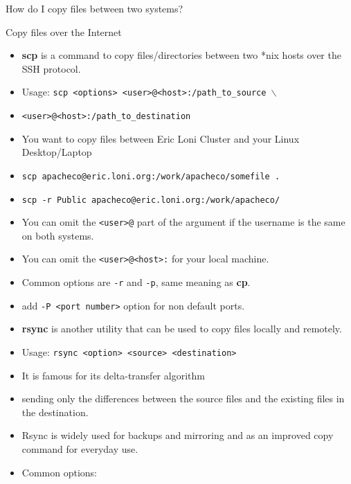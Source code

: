 \documentclass[slidestop,mathserif,compress,xcolor=svgnames]{beamer}
\newenvironment{bblock}[0]
{
\begin{beamerboxesrounded}[upper=uppercol1,lower=lowercol1,shadow=true]}
{\end{beamerboxesrounded}}
\begin{document}
\begin{frame}[allowframebreaks]{\small How do I copy files between two systems?} 
  \begin{bblock}{Copy files over the Internet}
    \begin{itemize}
      \item \textbf{scp} is a command to copy files/directories between two *nix hosts over the SSH protocol.
      \item Usage: \texttt{scp <options> <user>@<host>:/path\_to\_source $\backslash$}\\
      \item[] \quad\quad \texttt{<user>@<host>:/path\_to\_destination}
      \item[e.g.] You want to copy files between Eric Loni Cluster and your Linux Desktop/Laptop
      \item[] \texttt{scp apacheco@eric.loni.org:/work/apacheco/somefile .}
      \item[] \texttt{scp -r Public apacheco@eric.loni.org:/work/apacheco/}
      \item You can omit the \texttt{<user>@} part of the argument if the username is the same on both systems.
      \item You can omit the \texttt{<user>@<host>:} for your local machine.
      \item Common options are \texttt{-r} and \texttt{-p}, same meaning as \textbf{cp}.
      \item add \texttt{-P <port number>} option for non default ports.
    \end{itemize}
  \end{bblock}
  \framebreak
  \begin{bblock}{}
    \begin{itemize}
      \item \textbf{rsync} is another utility that can be used to copy files locally and remotely.
      \item Usage: \texttt{rsync <option> <source> <destination>}
      \item It is famous for its delta-transfer algorithm
      \item[i.e.] sending only the differences between  the  source  files and  the  existing  files in the destination.  
     \item Rsync is widely used for backups and mirroring and as an improved copy command for everyday use.
     \item Common options:
     \begin{enumerate}

\end{enumerate}
\end{itemize}
\end{bblock}
\end{frame}
\end{document}
